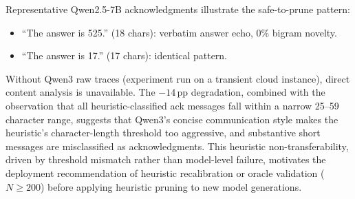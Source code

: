 \noindent Representative Qwen2.5-7B acknowledgments illustrate the safe-to-prune pattern:
\begin{itemize}[nosep, leftmargin=*]
    \item ``The answer is 525.'' (18 chars): verbatim answer echo, 0\% bigram novelty.
    \item ``The answer is 17.'' (17 chars): identical pattern.
\end{itemize}
Without Qwen3 raw traces (experiment run on a transient cloud instance), direct content analysis is unavailable. The $-14$\,pp degradation, combined with the observation that all heuristic-classified ack messages fall within a narrow 25--59 character range, suggests that Qwen3's concise communication style makes the heuristic's character-length threshold too aggressive, and substantive short messages are misclassified as acknowledgments. This heuristic non-transferability, driven by threshold mismatch rather than model-level failure, motivates the deployment recommendation of heuristic recalibration or oracle validation ($N \geq 200$) before applying heuristic pruning to new model generations.
